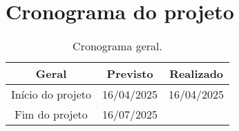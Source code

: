 
\chapter{Cronograma do projeto}

\begin{table}[htpb]
\begin{center}
\caption{Cronograma geral.}
\begin{tabular}{|c|c|c|}
\hline
\textbf{Geral}          & \textbf{Previsto} & \textbf{Realizado} \\ \hline
Início do projeto  & 16/04/2025 & 16/04/2025         \\ \hline
Fim do projeto   & 16/07/2025 &         \\ \hline
\end{tabular}
\end{center}
\end{table}

